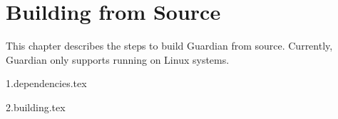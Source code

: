 
\chapter{Building from Source}
{
	This chapter describes the steps to build Guardian from source.
	Currently, Guardian only supports running on Linux systems.
	
	{1.dependencies.tex}
	
	{2.building.tex}
}


